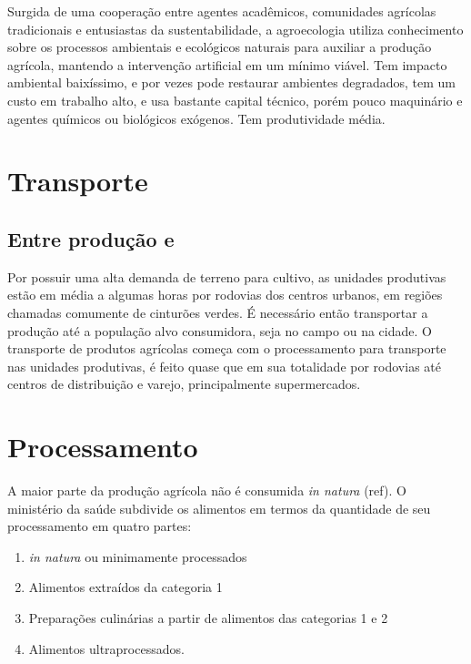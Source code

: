 \documentclass[]{article}
\begin{document}
	Surgida de uma cooperação entre agentes acadêmicos, comunidades agrícolas tradicionais e entusiastas da sustentabilidade, a agroecologia utiliza conhecimento sobre os processos ambientais e ecológicos naturais para auxiliar a produção agrícola, mantendo a intervenção artificial em um mínimo viável. Tem impacto ambiental baixíssimo, e por vezes pode restaurar ambientes degradados, tem um custo em trabalho alto, e usa bastante capital técnico, porém pouco maquinário e agentes químicos ou biológicos exógenos. Tem produtividade média.
	
	
	
	
	\section{Transporte}
	
	\subsection{Entre produção e }
	
	Por possuir uma alta demanda de terreno para cultivo, as unidades produtivas estão em média a algumas horas por rodovias dos centros urbanos, em regiões chamadas comumente de cinturões verdes. É necessário então transportar a produção até a população alvo consumidora, seja no campo ou na cidade. O transporte de produtos agrícolas começa com o processamento para transporte nas unidades produtivas, é feito quase que em sua totalidade por rodovias até centros de distribuição e varejo, principalmente supermercados.
	
	\section{Processamento}
	
	A maior parte da produção agrícola não é consumida \textit{in natura} (ref). O ministério da saúde subdivide os alimentos em termos da quantidade de seu processamento em quatro partes: 
	
	\begin{enumerate}
		\item \textit{in natura} ou minimamente processados
		\item Alimentos extraídos da categoria 1
		\item Preparações culinárias a partir de alimentos das categorias 1 e 2
		\item Alimentos ultraprocessados.
	\end{enumerate}
	
\end{document}
